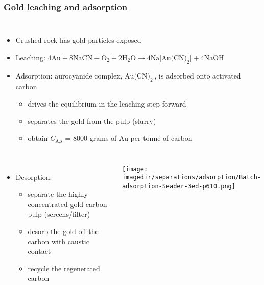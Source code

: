\begin{frame}\frametitle{Gold leaching and adsorption}	
	\begin{columns}[c]
			\begin{itemize}
				\item	Crushed rock has gold particles exposed
				\item	Leaching: $4\text{Au} + 8\text{NaCN} + \text{O}_2 + 2 \text{H}_2\text{O} \longrightarrow  4 \text{Na[Au(CN)}_2\text{]} + 4 \text{NaOH}$
				\item	Adsorption: aurocyanide complex, $\text{Au(CN)}_2^{-}$, is adsorbed onto activated carbon
					\begin{itemize}
						\item	drives the equilibrium in the leaching step forward
						\item	separates the gold from the pulp (slurry)
						\item	obtain $C_\text{A,s}$ = 8000 grams of Au per tonne of carbon
					\end{itemize}
			\end{itemize}			
	\end{columns}
	\begin{columns}[t]
			\begin{itemize}
				\item	Desorption: 
					\begin{itemize}
						\item	separate the highly concentrated gold-carbon pulp (screens/filter)
						\item	desorb the gold off the carbon with caustic contact
						\item	recycle the regenerated carbon
					\end{itemize}
			\end{itemize}
			\begin{center}
				\texttt{[image: \\imagedir/separations/adsorption/Batch-adsorption-Seader-3ed-p610.png]}
			\end{center}
	\end{columns}		
\end{frame}

